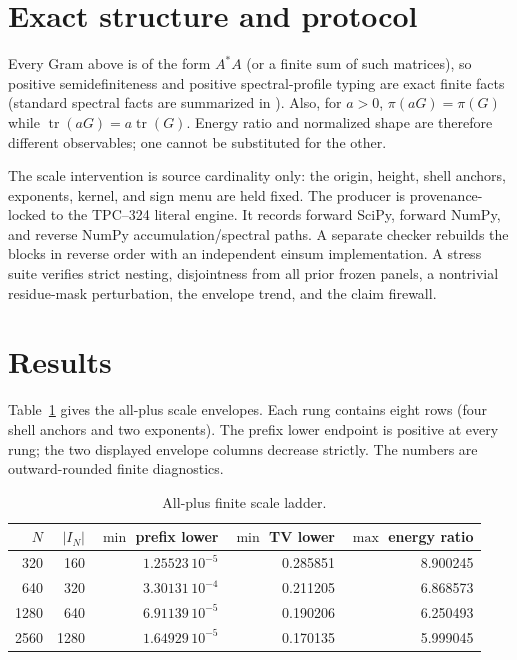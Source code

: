 \documentclass[10pt]{article}
\begin{document}
\section{Exact structure and protocol}

Every Gram above is of the form $A^*A$ (or a finite sum of such matrices), so
positive semidefiniteness and positive spectral-profile typing are exact finite
facts (standard spectral facts are summarized in
\cite{horn2013matrix}).  Also, for $a>0$, $\pi(aG)=\pi(G)$ while
$\operatorname{tr}(aG)=a\operatorname{tr}(G)$.  Energy ratio and normalized
shape are therefore different observables; one cannot be substituted for the
other.

The scale intervention is source cardinality only: the origin, height, shell
anchors, exponents, kernel, and sign menu are held fixed.  The producer is
provenance-locked to the TPC--324 literal engine.  It records forward SciPy,
forward NumPy, and reverse NumPy accumulation/spectral paths.  A separate
checker rebuilds the blocks in reverse order with an independent einsum
implementation.  A stress suite verifies strict nesting, disjointness from
all prior frozen panels, a nontrivial residue-mask perturbation, the envelope
trend, and the claim firewall.

\section{Results}

Table~\ref{tab:ladder} gives the all-plus scale envelopes.  Each rung contains
eight rows (four shell anchors and two exponents).  The prefix lower endpoint
is positive at every rung; the two displayed envelope columns decrease
strictly.  The numbers are outward-rounded finite diagnostics.

\begin{table}[ht]
\centering
\caption{All-plus finite scale ladder.}
\label{tab:ladder}
\small
\begin{tabular}{rrrrr}
\toprule
$N$ & $|I_N|$ & $\min$ prefix lower & $\min$ TV lower & $\max$ energy ratio\\
\midrule
320  & 160  & $1.25523\,10^{-5}$ & 0.285851 & 8.900245\\
640  & 320  & $3.30131\,10^{-4}$ & 0.211205 & 6.868573\\
1280 & 640  & $6.91139\,10^{-5}$ & 0.190206 & 6.250493\\
2560 & 1280 & $1.64929\,10^{-5}$ & 0.170135 & 5.999045\\
\bottomrule
\end{tabular}
\end{table}
\end{document}
